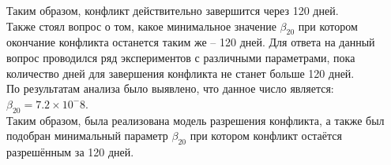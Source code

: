 Таким образом, конфликт действительно завершится через 120 дней.\\

Также стоял вопрос о том, какое минимальное значение $\beta_20$ при котором окончание конфликта останется таким же -- 120 дней. Для ответа на данный вопрос проводился ряд экспериментов с различными параметрами, пока количество дней для завершения конфликта не станет больше 120 дней.\\

По результатам анализа было выявлено, что данное число является: $\beta_{20} = 7.2 \times 10^-8$.\\

Таким образом, была реализована модель разрешения конфликта, а также был подобран минимальный параметр $\beta_{20}$ при котором конфликт остаётся разрешённым за 120 дней.